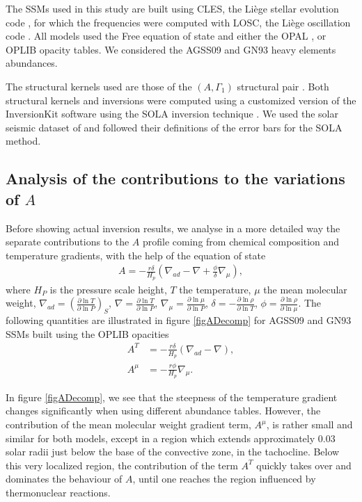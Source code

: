 \documentclass[a4paper,fleqn,usenatbib]{mnras}
\begin{document}
The SSMs used in this study are built using CLES, the Li\`ege stellar evolution code \citep{ScuflaireCles}, for which the frequencies were computed with LOSC, the Li\`ege oscillation code \citep{ScuflaireOsc}. All models used the Free equation of state \citep{Irwin} and either the OPAL \citep{OPAL}, or OPLIB \citep{Colgan} opacity tables. We considered the AGSS09 \citep{AGSS09} and GN93 \citep{GrevNoels} heavy elements abundances. 

The structural kernels used are those of the $\left( A, \Gamma_{1} \right)$ structural pair \citep{GoughPmod}. Both structural kernels and inversions were computed using a customized version of the InversionKit software using the SOLA inversion technique \citep{Pijpers}. We used the solar seismic dataset of \cite{BasuSun} and followed their definitions of the error bars for the SOLA method. 
 
\subsection{Analysis of the contributions to the variations of $A$}
Before showing actual inversion results, we analyse in a more detailed way the separate contributions to the $A$ profile coming from chemical composition and temperature gradients, with the help of the equation of state 
\begin{align}
A=-\frac{r \delta}{H_{p}}\left( \nabla_{ad}-\nabla  + \frac{\phi}{\delta}\nabla_{\mu}\right),
\end{align}
where $H_{P}$ is the pressure scale height, $T$ the temperature, $\mu$ the mean molecular weight, $\nabla_{ad}=\left(\frac{\partial \ln T}{\partial \ln P}\right)_{S}$, $\nabla=\frac{\partial \ln T}{\partial \ln P}$, $\nabla_{\mu}=\frac{\partial \ln \mu}{\partial \ln P}$, $\delta=-\frac{\partial \ln \rho}{\partial \ln T}$, $\phi=\frac{\partial \ln \rho }{\partial \ln \mu}$. The following quantities are illustrated in figure \ref{figADecomp} for AGSS$09$ and GN$93$ SSMs built using the OPLIB opacities
\begin{align}
A^{T}&=-\frac{r \delta}{H_{p}}\left( \nabla_{ad}-\nabla \right), \\
A^{\mu}&=-\frac{r \phi}{H_{p}}\nabla_{\mu}.
\end{align}

In figure \ref{figADecomp}, we see that the steepness of the temperature gradient changes significantly when using different abundance tables. However, the contribution of the mean molecular weight gradient term, $A^{\mu}$, is rather small and similar for both models, except in a region which extends approximately $0.03$ solar radii just below the base of the convective zone, in the tachocline. Below this very localized region, the contribution of the term $A^{T}$ quickly takes over and dominates the behaviour of $A$, until one reaches the region influenced by thermonuclear reactions.
\end{document}
